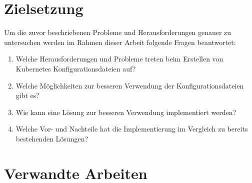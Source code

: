 \section{Zielsetzung}
Um die zuvor beschriebenen Probleme und Herausforderungen genauer zu untersuchen werden im Rahmen dieser Arbeit folgende Fragen beantwortet:
\begin{enumerate}
    \item Welche Herausforderungen und Probleme treten beim Erstellen von Kubernetes Konfigurationsdateien auf?
    \item Welche Möglichkeiten zur besseren Verwendung der Konfigurationsdateien gibt es?
    \item Wie kann eine Lösung zur besseren Verwendung implementiert werden?
    \item Welche Vor- und Nachteile hat die Implementierung im Vergleich zu bereits bestehenden Lösungen?
\end{enumerate}

\section{Verwandte Arbeiten}

